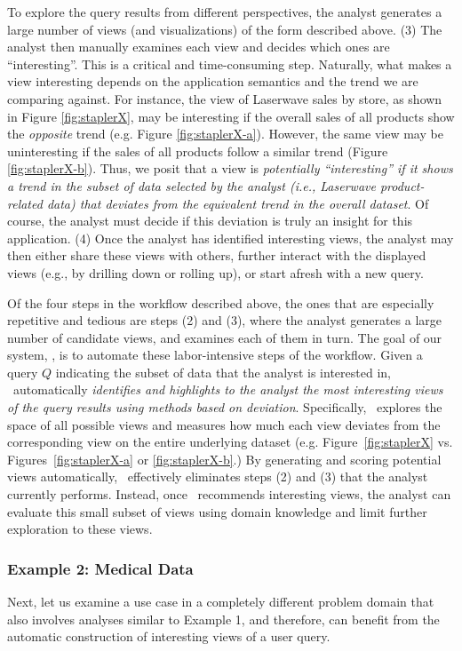 To explore the query results from different perspectives, the analyst generates
a large number of views (and visualizations) of the form described above.
(3) The analyst then manually examines each view and decides
which ones are ``interesting''. This is a critical and time-consuming step.
Naturally, what makes a view interesting depends on the 
application semantics and the trend we are comparing against.
For instance, the view of Laserwave sales by store, as shown in Figure
\ref{fig:staplerX}, may be interesting if the overall sales of all products show
the {\it opposite} trend (e.g. Figure \ref{fig:staplerX-a}). However, the same
view may be uninteresting if the sales of all products follow a similar trend (Figure \ref{fig:staplerX-b}).
Thus, we posit that  a view is {\em potentially ``interesting'' if it shows 
a trend in the subset of data selected by the analyst
(i.e., Laserwave product-related data)
that deviates from the equivalent trend in the overall dataset}.
Of course, the analyst must decide if this deviation 
is truly an insight for this application.
(4) Once the analyst has identified interesting views, the analyst may
then either share these views with others, further interact with
the displayed views (e.g., by drilling down or rolling up), or
start afresh with a new query.


Of the four steps in the workflow described above, the 
ones that are especially repetitive and tedious are steps (2) and (3),
where the analyst generates a large number of candidate views, and examines each
of them in turn. The goal of our system, \SeeDB, is to automate these
labor-intensive steps of the workflow. Given a query $Q$ indicating the subset
of data that the analyst is interested in, \SeeDB\ automatically {\em identifies and highlights to the analyst the most
interesting views of the query results using methods based on
deviation}. Specifically, \SeeDB\ explores the space of all possible views and
measures how much each view deviates from the corresponding view on the
entire underlying dataset (e.g. Figure~\ref{fig:staplerX} vs.
Figures~\ref{fig:staplerX-a} or \ref{fig:staplerX-b}.) By generating and
scoring potential views automatically, \SeeDB\ effectively eliminates
steps (2) and (3) that the analyst currently performs. Instead, once \SeeDB\
recommends interesting views, the analyst can evaluate this small
subset of views using domain knowledge and limit further
exploration to these views.  


\subsubsection*{Example 2: Medical Data}
Next, let us examine a use case in a completely different problem domain that
also involves analyses similar to Example 1, and therefore, can benefit from the
automatic construction of interesting views of a user query.


